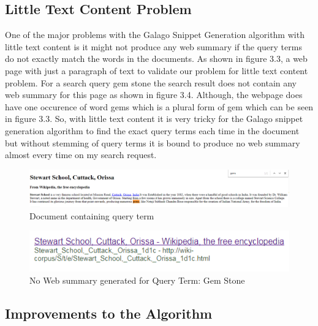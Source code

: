 \documentclass[12pt]{report}
\begin{document}
\subsection{Little Text Content Problem}
   
One of the major problems with the Galago Snippet Generation algorithm with little text content is it might not produce any web summary if the query terms do not exactly match the words in the documents. As shown in figure 3.3, a web page with just a paragraph of text to validate our problem for little text content problem. For a search query gem stone the search result does not contain any web summary for this page as shown in figure 3.4. Although, the webpage does have one occurence of word gems which is a plural form of gem which can be seen in figure 3.3. So, with little text content it is very tricky for the Galago snippet generation algorithm to find the exact query terms each time in the document but without stemming of query terms it is bound to produce no web summary almost every time on my search request.   
\begin{figure}[ht]
  \centering
  \includegraphics[width=1\textwidth]{Problem6_5/LittleTextContent.PNG}
  \caption{Document containing query term}
  \label{fig:3}
\end{figure}

\begin{figure}[ht]
  \centering
  \includegraphics[width=1\textwidth]{Problem6_5/NoWebSummary.PNG}
  \caption{No Web summary generated for Query Term: Gem Stone}
  \label{fig:4}
\end{figure}

\subsection{Improvements to the Algorithm}
\end{document}
